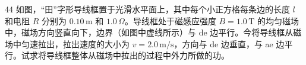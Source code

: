 \begin{problem}[第32届全国中学生物理竞赛复赛][导线框在磁场中运动]{44}
    如图，“田”字形导线框置于光滑水平面上，其中每个小正方格每条边的长度 $l$ 和电阻 $R$ 分别为 $0.10\,\mathrm{m}$ 和 $1.0\,\Omega$。导线框处于磁感应强度 $B = 1.0\,\mathrm{T}$ 的均匀磁场中，磁场方向竖直向下，边界（如图中虚线所示）与 de 边平行。今将导线框从磁场中匀速拉出，拉出速度的大小为 $v = 2.0\,\mathrm{m/s}$，方向与 de 边垂直，与 ae 边平行。试求将导线框整体从磁场中拉出的过程中外力所做的功。
\end{problem}